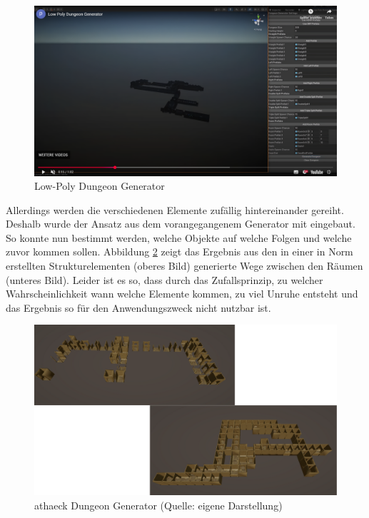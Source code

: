 \begin{figure}[ht]
\centering
\includegraphics[width=1\linewidth]{content/pictures/FirstSteps03.png}
\caption{Low-Poly Dungeon Generator \cite{past12pm_low_2024}}
\label{fig:dungeon-generator}
\end{figure}

Allerdings werden die verschiedenen Elemente zufällig hintereinander gereiht. Deshalb wurde der Ansatz aus dem vorangegangenem Generator mit eingebaut. So konnte nun bestimmt werden, welche Objekte auf welche Folgen und welche zuvor kommen sollen. Abbildung \ref{fig:athaeck-dungeon-generator} zeigt das Ergebnis aus den in einer in Norm erstellten Strukturelementen (oberes Bild) generierte Wege zwischen den Räumen (unteres Bild). Leider ist es so, dass durch das Zufallsprinzip, zu welcher Wahrscheinlichkeit wann welche Elemente kommen, zu viel Unruhe entsteht und das Ergebnis so für den Anwendungszweck nicht nutzbar ist.

\begin{figure}[ht]
\centering
\includegraphics[width=1\linewidth]{content/pictures/FirstSteps06.png}
\caption{athaeck Dungeon Generator (Quelle: eigene Darstellung)}
\label{fig:athaeck-dungeon-generator}
\end{figure}

